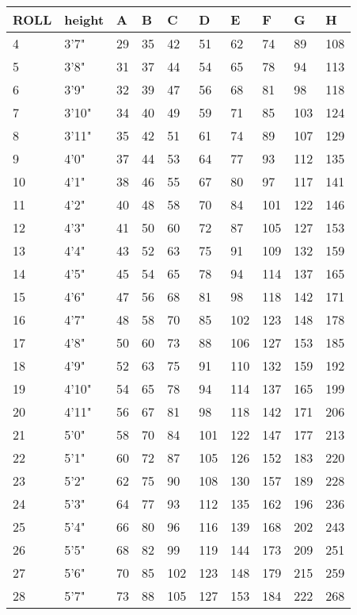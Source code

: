 \begin{tcolorbox}[breakable,boxrule=0pt]
\begin{tabular}{l l l l l l l l l l}
ROLL & height & A & B & C & D & E & F & G & H\\
\midrule
4 & 3'7" & 29 & 35 & 42 & 51 & 62 & 74 & 89 & 108\\
5 & 3'8" & 31 & 37 & 44 & 54 & 65 & 78 & 94 & 113\\
6 & 3'9" & 32 & 39 & 47 & 56 & 68 & 81 & 98 & 118\\
7 & 3'10" & 34 & 40 & 49 & 59 & 71 & 85 & 103 & 124\\
8 & 3'11" & 35 & 42 & 51 & 61 & 74 & 89 & 107 & 129\\
9 & 4'0" & 37 & 44 & 53 & 64 & 77 & 93 & 112 & 135\\
10 & 4'1" & 38 & 46 & 55 & 67 & 80 & 97 & 117 & 141\\
11 & 4'2" & 40 & 48 & 58 & 70 & 84 & 101 & 122 & 146\\
12 & 4'3" & 41 & 50 & 60 & 72 & 87 & 105 & 127 & 153\\
13 & 4'4" & 43 & 52 & 63 & 75 & 91 & 109 & 132 & 159\\
14 & 4'5" & 45 & 54 & 65 & 78 & 94 & 114 & 137 & 165\\
15 & 4'6" & 47 & 56 & 68 & 81 & 98 & 118 & 142 & 171\\
16 & 4'7" & 48 & 58 & 70 & 85 & 102 & 123 & 148 & 178\\
17 & 4'8" & 50 & 60 & 73 & 88 & 106 & 127 & 153 & 185\\
18 & 4'9" & 52 & 63 & 75 & 91 & 110 & 132 & 159 & 192\\
19 & 4'10" & 54 & 65 & 78 & 94 & 114 & 137 & 165 & 199\\
20 & 4'11" & 56 & 67 & 81 & 98 & 118 & 142 & 171 & 206\\
21 & 5'0" & 58 & 70 & 84 & 101 & 122 & 147 & 177 & 213\\
22 & 5'1" & 60 & 72 & 87 & 105 & 126 & 152 & 183 & 220\\
23 & 5'2" & 62 & 75 & 90 & 108 & 130 & 157 & 189 & 228\\
24 & 5'3" & 64 & 77 & 93 & 112 & 135 & 162 & 196 & 236\\
25 & 5'4" & 66 & 80 & 96 & 116 & 139 & 168 & 202 & 243\\
26 & 5'5" & 68 & 82 & 99 & 119 & 144 & 173 & 209 & 251\\
27 & 5'6" & 70 & 85 & 102 & 123 & 148 & 179 & 215 & 259\\
28 & 5'7" & 73 & 88 & 105 & 127 & 153 & 184 & 222 & 268\\

\end{tabular}
\end{tcolorbox}
